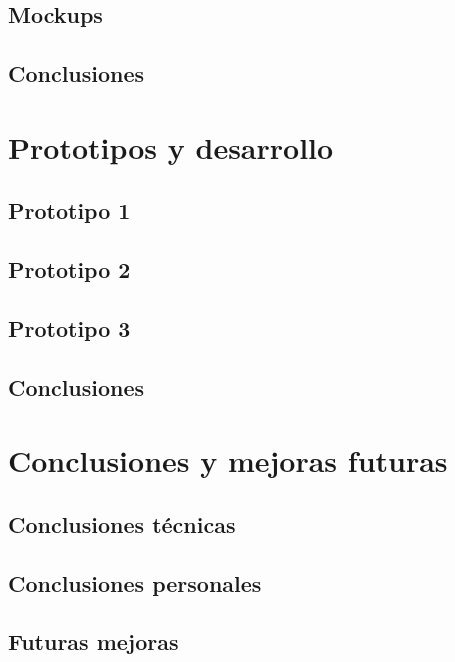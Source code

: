 \documentclass[twoside, openright, 11pt]{report}
\begin{document}
  \section{Mockups}
  
  \section{Conclusiones}

\chapter{Prototipos y desarrollo}\label{cap.prototipos y desarrollo}
  \section{Prototipo 1}
  \section{Prototipo 2}
  \section{Prototipo 3}
  \section{Conclusiones}

\chapter{Conclusiones y mejoras futuras}\label{cap.conclusiones y mejoras futuras}
  \section{Conclusiones técnicas}
  \section{Conclusiones personales}
  \section{Futuras mejoras}
\end{document}
